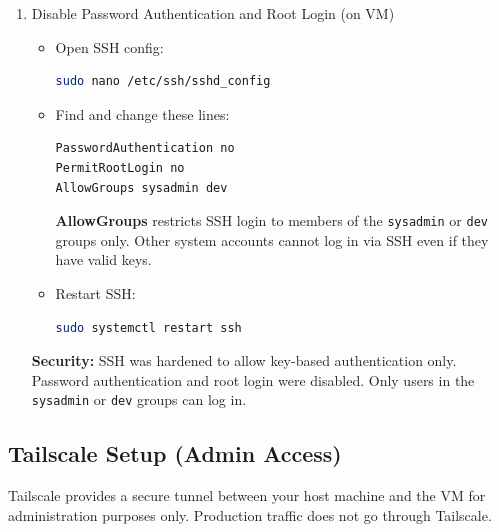 \documentclass[12pt,a4paper]{report}
\begin{document}
\begin{enumerate}
\item Disable Password Authentication and Root Login (on VM)
\begin{itemize}
\item Open SSH config:
\begin{lstlisting}[language=bash]
sudo nano /etc/ssh/sshd_config
\end{lstlisting}
\item Find and change these lines:
\begin{lstlisting}[language=bash]
PasswordAuthentication no
PermitRootLogin no
AllowGroups sysadmin dev
\end{lstlisting}
\begin{markdownnote}
\textbf{AllowGroups} restricts SSH login to members of the \texttt{sysadmin} or \texttt{dev} groups only. Other system accounts cannot log in via SSH even if they have valid keys.
\end{markdownnote}
\item Restart SSH:
\begin{lstlisting}[language=bash]
sudo systemctl restart ssh
\end{lstlisting}
\end{itemize}
\begin{markdownnote}
\textbf{Security:} SSH was hardened to allow key-based authentication only. Password authentication and root login were disabled. Only users in the \texttt{sysadmin} or \texttt{dev} groups can log in.
\end{markdownnote}
\end{enumerate}

\subsection{Tailscale Setup (Admin Access)}
Tailscale provides a secure tunnel between your host machine and the VM for administration purposes only. Production traffic does not go through Tailscale.
\end{document}
